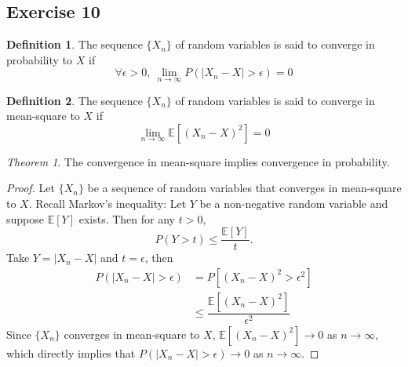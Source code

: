 \documentclass[11pt]{article}
\theoremstyle{definition}
\newtheorem{definition}{Definition}[section]
\theoremstyle{remark}
\theoremstyle{remark}
\newtheorem{theorem}{Theorem}[section]
\newcommand{\E}[1]{\mathbb{E}\left[#1 \right]}
\begin{document}
\subsection*{Exercise 10}
\begin{definition}
  The sequence $\{X_n\}$ of random variables is said to converge in
  probability to $X$ if
\[
\forall\epsilon>0, \ \lim_{n\rightarrow\infty}P\left(|X_n-X|>\epsilon\right)=0
\]
\end{definition}

\begin{definition}
  The sequence $\{X_n\}$ of random variables is said to converge in
  mean-square to $X$ if
\[
  \lim_{n\rightarrow\infty}\E{(X_n-X)^2}=0
\]
\end{definition}
\begin{theorem}
  The convergence in mean-square implies convergence in probability.
\end{theorem}

\begin{proof}
  Let $\{X_n\}$ be a sequence of random variables that converges in
  mean-square to $X$. Recall Markov's inequality: Let $Y$ be a
  non-negative random variable and suppose $\E{Y}$ exists. Then for
  any $t>0$,
\[
  P(Y>t) \leq \dfrac{\E{Y}}{t}.
\]
Take $Y=|X_n-X|$ and $t=\epsilon$, then
\[
\begin{split}
  P(|X_n-X|>\epsilon) &= P\left[(X_n-X)^2>\epsilon^2\right]\\
  & \leq \dfrac{\E{(X_n-X)^2}}{\epsilon^2}
\end{split}
\]
Since $\{X_n\}$ converges in mean-square to $X$, $\E{(X_n-X)^2}\rightarrow0$ as $n\rightarrow\infty$, which directly
implies that $P(|X_n-X|>\epsilon)\rightarrow0$ as
$n\rightarrow\infty$.
\end{proof}
\end{document}

